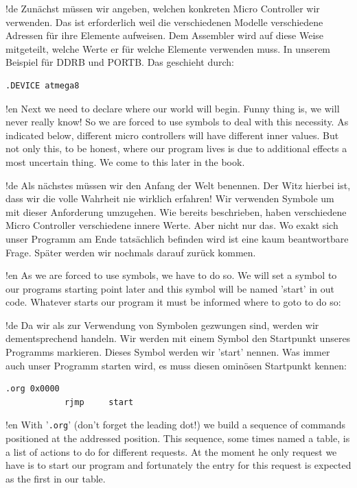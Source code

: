 !de Zunächst müssen wir angeben, welchen konkreten Micro Controller wir verwenden. Das ist erforderlich weil die verschiedenen Modelle verschiedene Adressen für ihre Elemente aufweisen. Dem Assembler wird auf diese Weise mitgeteilt, welche Werte er für welche Elemente verwenden muss. In unserem Beispiel für DDRB und PORTB. Das geschieht durch:

\begin{lstlisting}
.DEVICE atmega8
\end{lstlisting}



!en Next we need to declare where our world will begin. Funny thing is, we will never really know! So we are forced to use symbols to deal with this necessity. As indicated below, different micro controllers will have different inner values. But not only this, to be honest, where our program lives is due to additional effects a most uncertain thing. We come to this later in the book.

!de Als nächstes müssen wir den Anfang der Welt benennen. Der Witz hierbei ist, dass wir die volle Wahrheit nie wirklich erfahren! Wir verwenden Symbole um mit dieser Anforderung umzugehen. Wie bereits beschrieben, haben verschiedene Micro Controller verschiedene innere Werte. Aber nicht nur das. Wo exakt sich unser Programm am Ende tatsächlich befinden wird ist eine kaum beantwortbare Frage. Später werden wir nochmals darauf zurück kommen.


!en As we are forced to use symbols, we have to do so. We will set a symbol to our programs starting point later and this symbol will be named 'start' in out code. Whatever starts our program it must be informed where to goto to do so:

!de Da wir als zur Verwendung von Symbolen gezwungen sind, werden wir dementsprechend handeln. Wir werden mit einem Symbol den Startpunkt unseres Programms markieren. Dieses Symbol werden wir 'start' nennen. Was immer auch unser Programm starten wird, es muss diesen ominösen Startpunkt kennen:

\begin{lstlisting}
.org 0x0000
            rjmp     start 
\end{lstlisting}



!en With '\texttt{.org}' (don't forget the leading dot!) we build a sequence of commands positioned at the addressed position. This sequence, some times named a table, is a list of actions to do for different requests. At the moment he only request we have is to start our program and fortunately the entry for this request is expected as the first in our table.

